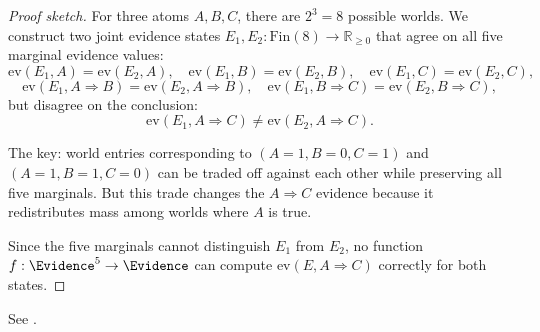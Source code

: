 \documentclass[11pt,openany]{report}
\begin{document}
\begin{proof}[Proof sketch]
For three atoms $A, B, C$, there are $2^3 = 8$ possible worlds.
We construct two joint evidence states $E_1, E_2 :
\mathrm{Fin}(8) \to \mathbb{R}_{\ge 0}$ that agree on all five
marginal evidence values:
\[
  \mathrm{ev}(E_1, A) = \mathrm{ev}(E_2, A), \quad
  \mathrm{ev}(E_1, B) = \mathrm{ev}(E_2, B), \quad
  \mathrm{ev}(E_1, C) = \mathrm{ev}(E_2, C),
\]
\[
  \mathrm{ev}(E_1, A \!\Rightarrow\! B) = \mathrm{ev}(E_2, A \!\Rightarrow\! B), \quad
  \mathrm{ev}(E_1, B \!\Rightarrow\! C) = \mathrm{ev}(E_2, B \!\Rightarrow\! C),
\]
but disagree on the conclusion:
\[
  \mathrm{ev}(E_1, A \!\Rightarrow\! C) \ne \mathrm{ev}(E_2, A \!\Rightarrow\! C).
\]

The key: world entries corresponding to $(A\!=\!1, B\!=\!0, C\!=\!1)$
and $(A\!=\!1, B\!=\!1, C\!=\!0)$ can be traded off against each other
while preserving all five marginals.  But this trade changes the
$A \Rightarrow C$ evidence because it redistributes mass among worlds
where $A$ is true.

Since the five marginals cannot distinguish $E_1$ from $E_2$, no
function $f : \Evidence^5 \to \Evidence$ can compute $\mathrm{ev}(E, A \!\Rightarrow\! C)$
correctly for both states.
\end{proof}

See .
\end{document}
